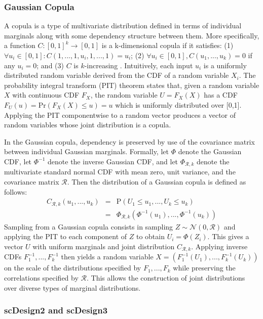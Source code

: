 \documentclass[unnumsec,webpdf,contemporary,large]{oup-authoring-template}%
\theoremstyle{thmstyleone}%
\theoremstyle{thmstyletwo}%
\theoremstyle{thmstylethree}%
\begin{document}
\subsubsection{Gaussian Copula}

A copula is a type of multivariate distribution defined in terms of individual marginals along with some dependency structure between them. More specifically, a function $C: [0,1]^k\rightarrow[0,1]$ is a k-dimensional copula if it satisfies: (1) $\forall u_i \in [0,1]: C(1,...,1,u_i,1,...,1)=u_i$; (2) $\forall u_i \in [0,1], C(u_1,...,u_k)=0$ if any $u_i=0$; and (3) $C$ is $k$-increasing \cite{nelsen2006introduction}. Intuitively, each input $u_i$ is a uniformly distributed random variable derived from the CDF of a random variable $X_i$. The probability integral transform (PIT) theorem states that, given a random variable $X$ with continuous CDF $F_X$, the random variable $U=F_X(X)$ has a CDF $F_U(u) =\text{Pr}(F_X(X)\leq u)=u$ which is uniformly distributed over [0,1]. Applying the PIT componentwise to a random vector produces a vector of random variables whose joint distribution is a copula.

In the Gaussian copula, dependency is preserved by use of the covariance matrix between individual Gaussian marginals. Formally, let $\Phi$ denote the Gaussian CDF, let $\Phi^{-1}$ denote the inverse Gaussian CDF, and let $\Phi_{\mathcal{R},k}$ denote the multivariate standard normal CDF with mean zero, unit variance, and the covariance matrix $\mathcal{R}$. Then the distribution of a Gaussian copula is defined as follows:
\begin{eqnarray}
    C_{\mathcal{R},k}(u_1,...,u_k) & = &\text{P}(U_1\leq u_1,...,U_k\leq u_k) \\
    &=&\Phi_{\mathcal{R},k}(\Phi^{-1}(u_1), ...,\Phi^{-1}(u_k)) 
\end{eqnarray}
Sampling from a Gaussian copula consists in sampling $Z \sim \mathcal{N}(0,\mathcal{R})$ and applying the PIT to each component of $Z$ to obtain $U_i=\Phi(Z_i)$. This gives a vector $U$ with uniform marginals and joint distribution $C_{\mathcal{R},k}$. Applying inverse CDFs $F^{-1}_1, ...,F^{-1}_k$ then yields a random variable $X = (F^{-1}_1(U_1),...,F^{-1}_k(U_k))$ on the scale of the distributions specified by $F_1,...,F_k$ while preserving the correlations specified by $\mathcal{R}$. This allows the construction of joint distributions over diverse types of marginal distributions.

\subsubsection{scDesign2 and scDesign3}\label{sec:scdesign}
\end{document}
